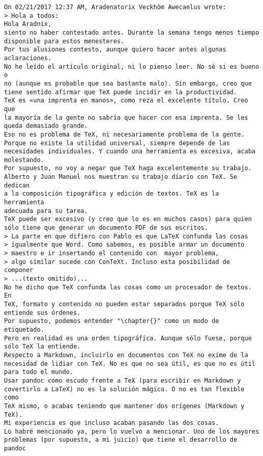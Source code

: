 \documentclass[a4paper,10pt]{article}
\begin{document}
\begin{lstlisting}
On 02/21/2017 12:37 AM, Aradenatorix Veckhôm Awecaelus wrote:
> Hola a todos:
Hola Aradnix,
siento no haber contestado antes. Durante la semana tengo menos tiempo
disponible para estos menesteres.
Por tus alusiones contesto, aunque quiero hacer antes algunas aclaraciones.
No he leído el artículo original, ni lo pienso leer. No sé si es bueno o
no (aunque es probable que sea bastante malo). Sin embargo, creo que
tiene sentido afirmar que TeX puede incidir en la productividad.
TeX es «una imprenta en manos», como reza el excelente título. Creo que
la mayoría de la gente no sabría que hacer con esa imprenta. Se les
queda demasiado grande.
Eso no es problema de TeX, ni necesariamente problema de la gente.
Porque no existe la utilidad universal, siempre depende de las
necesidades individuales. Y cuando una herramienta es excesiva, acaba
molestando.
Por supuesto, no voy a negar que TeX haga excelentemente su trabajo.
Alberto y Juan Manuel nos muestran su trabajo diario con TeX. Se dedican
a la composición tipográfica y edición de textos. TeX es la herramienta
adecuada para su tarea.
TeX puede ser excesivo (y creo que lo es en muchos casos) para quien
sólo tiene que generar un documento PDF de sus escritos.
> La parte en que difiero con Pablo es que LaTeX confunda las cosas
> igualmente que Word. Como sabemos, es posible armar un documento
> maestro e ir insertando el contenido con  mayor problema,
> algo similar sucede con ConTeXt. Incluso esta posibilidad de componer
> ...(texto omitido)...
No he dicho que TeX confunda las cosas como un procesador de textos. En
TeX, formato y contenido no pueden estar separados porque TeX sólo
entiende sus órdenes.
Por supuesto, podemos entender "\chapter{}" como un modo de etiquetado.
Pero en realidad es una orden tipográfica. Aunque sólo fuese, porque
sólo TeX la entiende.
Respecto a Markdown, incluirlo en documentos con TeX no exime de la
necesidad de lidiar con TeX. No es que no sea útil, es que no es útil
para todo el mundo.
Usar pandoc como escudo frente a TeX (para escribir en Markdown y
covertirlo a LaTeX) no es la solución mágica. O no es tan flexible como
TeX mismo, o acabas teniendo que mantener dos orígenes (Markdown y TeX).
Mi experiencia es que incluso acaban pasando las dos cosas.
Lo habré mencionado ya, pero lo vuelvo a mencionar. Uno de los mayores
problemas (por supuesto, a mi juicio) que tiene el desarrollo de pandoc

\end{lstlisting}
\end{document}

